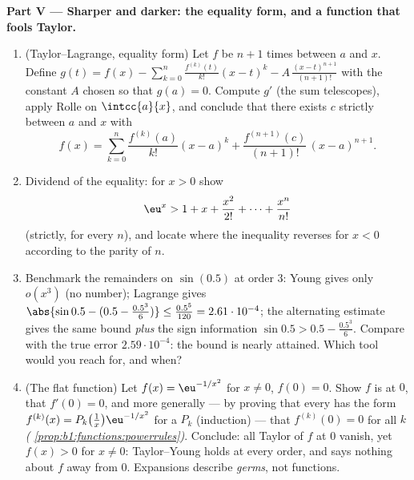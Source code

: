 \begin{problem}
\medskip
\noindent\textbf{Part V --- Sharper and darker: the equality
form, and a function that fools Taylor.}
\begin{enumerate}[resume]
  \item (Taylor--Lagrange, equality form) Let $f$ be $n + 1$
        times  between $a$ and $x$. Define $g(t) =
        f(x) - \sum_{k=0}^{n} \frac{f^{(k)}(t)}{k!}(x - t)^k -
        A\,\frac{(x-t)^{n+1}}{(n+1)!}$ with the constant $A$
        chosen so that $g(a) = 0$. Compute $g'$ (the sum
        telescopes), apply Rolle on $\intcc{a}{x}$, and conclude
        that there exists $c$ strictly between $a$ and $x$ with
        \[
        f(x) = \sum_{k=0}^{n} \frac{f^{(k)}(a)}{k!}(x-a)^k
        + \frac{f^{(n+1)}(c)}{(n+1)!}\,(x-a)^{n+1} .
        \]
  \item Dividend of the equality: for $x > 0$ show
        \[
        \eu^x > 1 + x + \frac{x^2}{2!} + \dots +
        \frac{x^n}{n!}
        \]
        (strictly, for every $n$), and locate where the
        inequality reverses for $x < 0$ according to the parity
        of $n$.
  \item Benchmark the remainders on $\sin(0.5)$ at order $3$:
        Young gives only $o(x^3)$ (no number); Lagrange gives
        $\abs{\sin 0.5 - (0.5 - \frac{0.5^3}{6})} \leq
        \frac{0.5^5}{120} = 2.61\cdot10^{-4}$; the alternating
        estimate gives the same bound \emph{plus} the sign
        information $\sin 0.5 > 0.5 - \frac{0.5^3}{6}$. Compare
        with the true error $2.59\cdot10^{-4}$: the bound is
        nearly attained. Which tool would you reach for, and
        when?
  \item (The flat function) Let $f(x) = \eu^{-1/x^2}$ for $x
        \neq 0$, $f(0) = 0$. Show $f$ is  at $0$, that
        $f'(0) = 0$, and more generally --- by proving that
        every  has the form $f^{(k)}(x) =
        P_k\bigl(\frac1x\bigr)\eu^{-1/x^2}$ for a 
        $P_k$ (induction) --- that $f^{(k)}(0) = 0$ for all $k$
        \emph{(
        \cref{prop:b1:functions:powerrules})}. Conclude: all
        Taylor  of $f$ at $0$ vanish, yet $f(x) > 0$
        for $x \neq 0$: Taylor--Young holds at every order, and
        says nothing about $f$ away from $0$. Expansions
        describe \emph{germs}, not functions.
\end{enumerate}


\end{problem}
